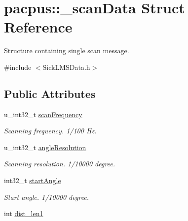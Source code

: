 \hypertarget{structpacpus_1_1__scanData}{\section{pacpus\-:\-:\-\_\-scan\-Data Struct Reference}
\label{structpacpus_1_1__scanData}
}


Structure containing single scan message.  




{\ttfamily \#include $<$Sick\-L\-M\-S\-Data.\-h$>$}

\subsection*{Public Attributes}
\begin{DoxyCompactItemize}
\item 
\hypertarget{structpacpus_1_1__scanData_a1b80704115ca1e619ae60c5a1565c0ce}{u\-\_\-int32\-\_\-t \hyperlink{structpacpus_1_1__scanData_a1b80704115ca1e619ae60c5a1565c0ce}{scan\-Frequency}}\label{structpacpus_1_1__scanData_a1b80704115ca1e619ae60c5a1565c0ce}

\begin{DoxyCompactList}\small\item\em Scanning frequency. 1/100 Hz. \end{DoxyCompactList}\item 
\hypertarget{structpacpus_1_1__scanData_a71a211e9e33cec8c59074f5e5d0587fc}{u\-\_\-int32\-\_\-t \hyperlink{structpacpus_1_1__scanData_a71a211e9e33cec8c59074f5e5d0587fc}{angle\-Resolution}}\label{structpacpus_1_1__scanData_a71a211e9e33cec8c59074f5e5d0587fc}

\begin{DoxyCompactList}\small\item\em Scanning resolution. 1/10000 degree. \end{DoxyCompactList}\item 
\hypertarget{structpacpus_1_1__scanData_a757c7bb547044098e65bd88ae6a7fab5}{int32\-\_\-t \hyperlink{structpacpus_1_1__scanData_a757c7bb547044098e65bd88ae6a7fab5}{start\-Angle}}\label{structpacpus_1_1__scanData_a757c7bb547044098e65bd88ae6a7fab5}

\begin{DoxyCompactList}\small\item\em Start angle. 1/10000 degree. \end{DoxyCompactList}\item 
\hypertarget{structpacpus_1_1__scanData_ab85c8b8fda7bbdeedf9942466849fced}{int \hyperlink{structpacpus_1_1__scanData_ab85c8b8fda7bbdeedf9942466849fced}{dist\-\_\-len1}}\label{structpacpus_1_1__scanData_ab85c8b8fda7bbdeedf9942466849fced}


\end{DoxyCompactItemize}
